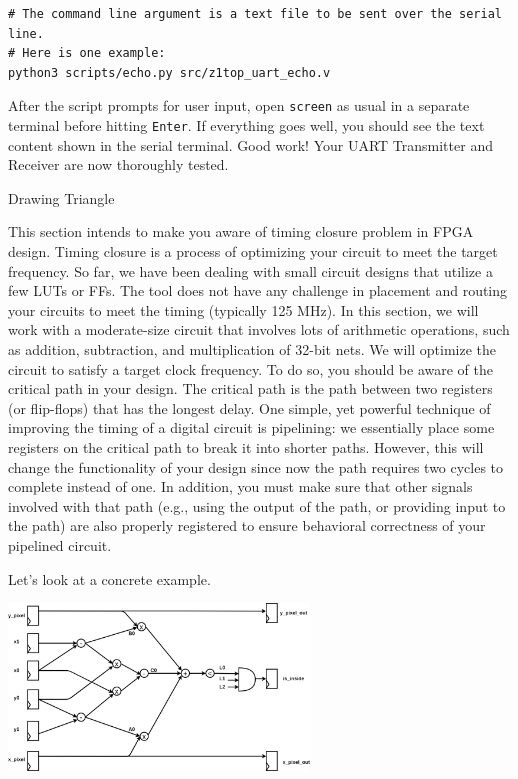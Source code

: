 \documentclass[11pt]{article}
\makeatletter
\renewcommand{\section}
{\@startsection {section}{1}{0pt}
 {-2ex}
 {1ex}
 {\bfseries\Large}}
\makeatother
\begin{document}
\begin{verbatim}
# The command line argument is a text file to be sent over the serial line.
# Here is one example:
python3 scripts/echo.py src/z1top_uart_echo.v
\end{verbatim}

After the script prompts for user input, open \verb|screen| as usual in a separate terminal before hitting \texttt{Enter}. If everything goes well, you should see the text content shown in the serial terminal. Good work! Your UART Transmitter and Receiver are now thoroughly tested.

\section{Drawing Triangle}

This section intends to make you aware of timing closure problem in FPGA design. Timing closure is a process of optimizing your circuit to meet the target frequency. So far, we have been dealing with small circuit designs that utilize a few LUTs or FFs. The tool does not have any challenge in placement and routing your circuits to meet the timing (typically 125 MHz). In this section, we will work with a moderate-size circuit that involves lots of arithmetic operations, such as addition, subtraction, and multiplication of 32-bit nets. We will optimize the circuit to satisfy a target clock frequency. To do so, you should be aware of the critical path in your design. The critical path is the path between two registers (or flip-flops) that has the longest delay. One simple, yet powerful technique of improving the timing of a digital circuit is pipelining: we essentially place some registers on the critical path to break it into shorter paths. However, this will change the functionality of your design since now the path requires two cycles to complete instead of one. In addition, you must make sure that other signals involved with that path (e.g., using the output of the path, or providing input to the path) are also properly registered to ensure behavioral correctness of your pipelined circuit.


Let's look at a concrete example.

\begin{center}
\includegraphics[width=0.6\textwidth]{figs/point_in_triangle.png}
\end{center}
\end{document}
